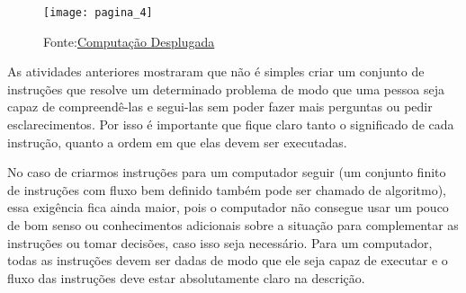 \label{comp-arr1}


\begin{figure}[H]
\centering

\texttt{[image: pagina\_4]}
\caption{Fonte:\href{desplugada.ime.unicamp.br}{Computação Desplugada}}
\end{figure}

As atividades anteriores mostraram que não é simples criar um conjunto de instruções que resolve um determinado problema de modo que uma pessoa seja capaz de compreendê-las e segui-las sem poder fazer mais perguntas ou pedir esclarecimentos. Por isso é importante que fique claro tanto o significado de cada instrução, quanto a ordem em que elas devem ser executadas.

No caso de criarmos instruções para um computador seguir (um conjunto finito de instruções com fluxo bem definido também pode ser chamado de algoritmo), essa exigência fica ainda maior, pois o computador não consegue usar um pouco de bom senso ou conhecimentos adicionais sobre a situação para complementar as instruções ou tomar decisões, caso isso seja necessário. Para um computador, todas as instruções devem ser dadas de modo que ele seja capaz de executar e o fluxo das instruções deve estar absolutamente claro na descrição.

